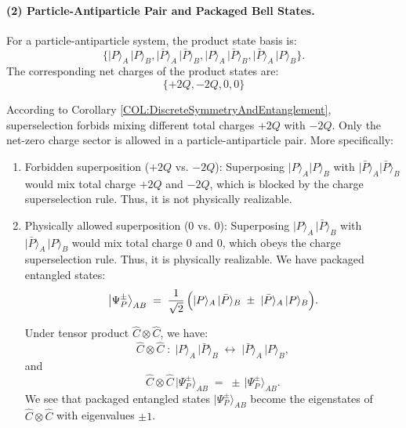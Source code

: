 \documentclass[12pt,a4paper]{article}
\begin{document}
\paragraph{(2) Particle-Antiparticle Pair and Packaged Bell States.}
For a particle-antiparticle system, the product state basis is:
$$
\{
\lvert P\rangle_A\,\lvert P\rangle_B,
\lvert \bar{P}\rangle_A\,\lvert \bar{P}\rangle_B,
\lvert P\rangle_A\,\lvert \bar{P}\rangle_B,
\lvert \bar{P}\rangle_A\,\lvert P\rangle_B
\}.
$$
The corresponding net charges of the product states are:
$$
\{+2Q, -2Q, 0, 0\}
$$


According to Corollary \ref{COL:DiscreteSymmetryAndEntanglement}, superselection forbids mixing different total charges $+2Q$ with $-2Q$.
Only the net-zero charge sector is allowed in a particle-antiparticle pair.
More specifically:
\begin{enumerate}
	\item Forbidden superposition ($+2Q$ vs. $-2Q$):
	Superposing $\lvert P\rangle_A \lvert P\rangle_B$ with $\lvert \bar{P}\rangle_A \lvert \bar{P}\rangle_B$ would mix total charge $+2Q$ and $-2Q$, which is blocked by the charge superselection rule. Thus, it is not physically realizable.
	
	\item Physically allowed superposition (0 vs. 0):
	Superposing $\lvert P\rangle_A \,\lvert \bar{P}\rangle_B$ with $\lvert \bar{P}\rangle_A \,\lvert P\rangle_B$ would mix total charge $0$ and $0$, which obeys the charge superselection rule.
	Thus, it is physically realizable.
	We have packaged entangled states:	
	\begin{equation}\label{EQ:PsiPES}
		\bigl\vert \Psi_P^\pm\bigr\rangle_{AB}
		\;=\;
		\frac{1}{\sqrt{2}}\,
		\Bigl(
		\lvert P\rangle_A \,\lvert \bar{P}\rangle_B 
		\;\pm\;
		\lvert \bar{P}\rangle_A \,\lvert P\rangle_B
		\Bigr).
	\end{equation}
	
	Under tensor product $\hat{C}\otimes \hat{C}$, we have:
	\[
	\hat{C} \otimes \hat{C}
	\;:\;
	\lvert P\rangle_A\,\lvert \bar{P}\rangle_B
	\;\leftrightarrow\;
	\lvert \bar{P}\rangle_A\,\lvert P\rangle_B,
	\]
	and
	\[
	\hat{C} \otimes \hat{C} \,\bigl\vert \Psi_P^\pm\bigr\rangle_{AB} \;=\; \pm\,\bigl\vert \Psi_P^\pm\bigr\rangle_{AB}.
	\]
	We see that packaged entangled states $\bigl\vert \Psi_P^\pm\bigr\rangle_{AB}$ become the eigenstates of $\hat{C}\otimes \hat{C}$ with eigenvalues $\pm1$.
\end{enumerate}
\end{document}
